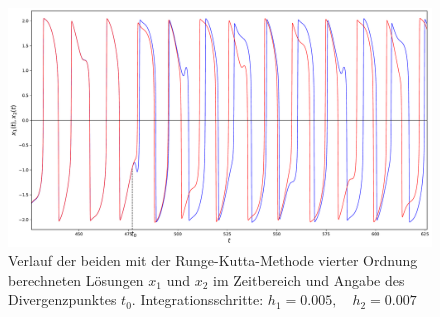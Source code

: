 \begin{figure}
\includegraphics[width=\textwidth]{papers/vanderpol/figures/RK_schritt_delta_2e-3.pdf}
\caption{Verlauf der beiden mit der Runge-Kutta-Methode vierter Ordnung berechneten Lösungen $x_1$ und $x_2$ im Zeitbereich und Angabe des Divergenzpunktes $t_0$. Integrationsschritte: $h_1 = 0.005, \quad h_2 = 0.007$\label{vanderpol:figures:RK_schritt_2e-3_2}}
\end{figure}

